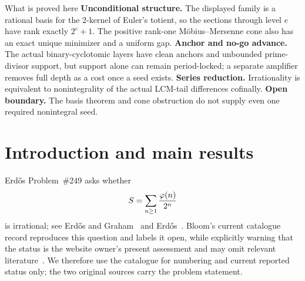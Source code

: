 \documentclass[11pt]{article}
\newcommand{\Stot}{S}
\begin{document}
\begin{abstract}
These advances do not settle Erd\H{o}s Problem~\#249, which asks whether
\[
  \Stot=\sum_{n\ge1}\frac{\ph(n)}{2^n}
\]
is irrational.  For $H_a=\lcm(1,\ldots,2^a)$ and
$R_a=\operatorname{totientTail}(2H_a)-\operatorname{totientTail}(H_a)$, we
prove the exact criterion
\[
  \Stot\notin\Q
  \quad\Longleftrightarrow\quad
  \forall a_0\ \exists a\ge a_0, R_a\notin\Z
\]
The actual-LCM and canonical Mersenne formulas are exact coordinates for that
same unresolved burden, not stronger progress than the anchor/no-go and
amplification theorems above. Two quantitative routes also remain
conditional: one separates the actual LCM orbit from the integers; the other
controls four terms in a first-harmonic decomposition. Their cofinal hypotheses
are unproved. The exact open boundary is therefore arithmetic control of the
actual tail, not the finite-rank structure of the totient's dyadic sections.
\end{abstract}

\begin{paperresult}{What is proved here}
\textbf{Unconditional structure.} The displayed family is a rational basis
for the $2$-kernel of Euler's totient, so the sections through level $e$
have rank exactly $2^e+1$.  The positive rank-one
M\"obius--Mersenne cone also has an exact unique minimizer and a uniform gap.
\textbf{Anchor and no-go advance.} The actual binary-cyclotomic layers have
clean anchors and unbounded prime-divisor support, but support alone can remain
period-locked; a separate amplifier removes full depth as a cost once a seed
exists.
\textbf{Series reduction.} Irrationality is equivalent to nonintegrality of
the actual LCM-tail differences cofinally.  \textbf{Open boundary.} The basis
theorem and cone obstruction do not supply even one required nonintegral seed.
\end{paperresult}

\section{Introduction and main results}\label{sec:results}

Erd\H{o}s Problem~\#249 asks whether
\[
  \Stot=\sum_{n\ge1}\frac{\ph(n)}{2^n}
\]
is irrational; see Erd\H{o}s and Graham~\cite[p.~61]{erdosgraham1980} and
Erd\H{o}s~\cite[p.~102]{erdos1988}.  Bloom's current catalogue record
reproduces this question and labels it open, while explicitly warning that
the status is the website owner's present assessment and may omit relevant
literature~\cite{erdosproblems}.  We therefore use the catalogue for
numbering and current reported status only; the two original sources carry
the problem statement.
\end{document}
